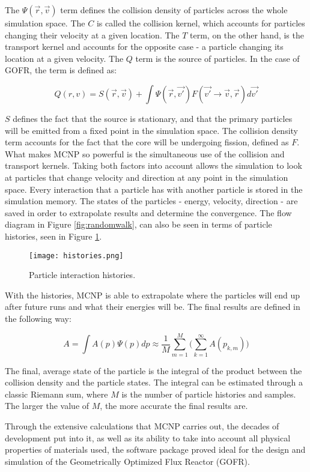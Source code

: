 The $\Psi(\vec{r},\vec{v})$ term defines the collision density of particles across the whole simulation space. The $C$ is called the collision kernel, which accounts for particles changing their velocity at a given location. The $T$ term, on the other hand, is the transport kernel and accounts for the opposite case - a particle changing its location at a given velocity. The $Q$ term is the source of particles. In the case of GOFR, the term is defined as:

\begin{equation}
Q(r,v) = S(\vec{r},\vec{v}) + \int\Psi(\vec{r},\vec{v'})F(\vec{v'}\rightarrow \vec{v},\vec{r})d\vec{v'}
\end{equation}

$S$ defines the fact that the source is stationary, and that the primary particles will be emitted from a fixed point in the simulation space. The collision density term accounts for the fact that the core will be undergoing fission, defined as $F$. What makes MCNP so powerful is the simultaneous use of the collision and transport kernels. Taking both factors into account allows the simulation to look at particles that change velocity and direction at any point in the simulation space. Every interaction that a particle has with another particle is stored in the simulation memory. The states of the particles - energy, velocity, direction - are saved in order to extrapolate results and determine the convergence. The flow diagram in Figure \ref{fig:randomwalk}, can also be seen in terms of particle histories, seen in Figure \ref{fig:histories}.

\begin{figure}[!htbp]
\centering
\texttt{[image: histories.png]}
\caption{Particle interaction histories.}
\label{fig:histories}
\end{figure}

With the histories, MCNP is able to extrapolate where the particles will end up after future runs and what their energies will be. The final results are defined in the following way:

\begin{equation*}
A = \int A(p)\Psi(p)dp \approx \frac{1}{M}\sum_{m=1}^M\Big(\sum_{k=1}^\infty A(p_{k,m})\Big)
\end{equation*}

The final, average state of the particle is the integral of the product between the collision density and the particle states. The integral can be estimated through a classic Riemann sum, where $M$ is the number of particle histories and samples. The larger the value of $M$, the more accurate the final results are. 

Through the extensive calculations that MCNP carries out, the decades of development put into it, as well as its ability to take into account all physical properties of materials used, the software package proved ideal for the design and simulation of the Geometrically Optimized Flux Reactor (GOFR).
